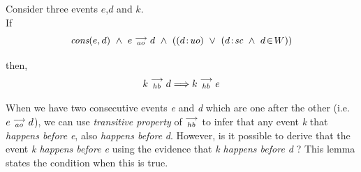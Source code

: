 
\begin{lemma} 
    \label{Lemma1}
    Consider three events $e$,$d$ and $k$. \\

    If
        \[
            \cons{e}{d} \ \wedge \ \reln{e}{ao}{d} \ \wedge \
            (
                (\et{d}{uo}) \ \vee \
                (\et{d}{sc} \ \wedge \ \event{d}{W})
            )
        \]
        
    then,
        \[
            k\stackrel{\longrightarrow}{_{hb}}d \Longrightarrow k\stackrel{\longrightarrow}{_{hb}}e
        \]
      
    When we have two consecutive events \textit{e} and \textit{d} which are one after the other (i.e. $e\stackrel{\longrightarrow}{_{ao}}d$), we can use \textit{transitive property} of $\stackrel{\longrightarrow}{_{hb}}$ to infer that any event \textit{k} that \textit{happens before} \textit{e}, also \textit{happens before} \textit{d}. However, is it possible to derive that the event \textit{k happens before e} using the evidence that \textit{k happens before d} ? This lemma states the condition when this is true.
    
\end{lemma}

